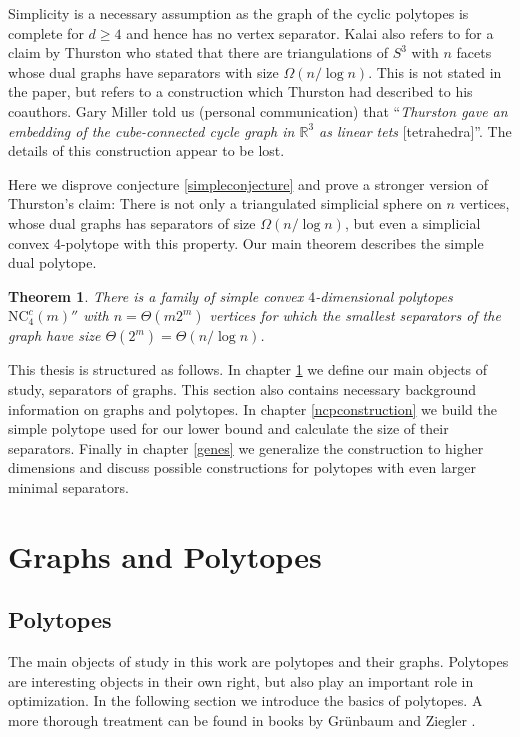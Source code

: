 \documentclass[a4paper,12pt]{book}
\theoremstyle{plain}
\newtheorem{theorem}{Theorem}[section]
\theoremstyle{definition}
\newcommand\NCC{\mathrm{NC}^c}
\begin{document}
Simplicity is a necessary assumption as the graph of the cyclic polytopes is complete for 
$d\geq 4$ and hence has no vertex separator. Kalai also refers to 
\cite{MillerTengThurstonVavasis} for a claim by Thurston who stated that there are triangulations of 
$S^3$ with $n$ facets whose dual graphs have separators with size $\Omega(n/\log n)$. This is not 
stated in the paper, but refers to a construction which Thurston had described to his 
coauthors. Gary Miller told us (personal communication) that 
“\textit{Thurston gave an embedding of the cube-connected cycle graph in $\mathbb{R}^3$
as linear tets} [tetrahedra]”. The details of this construction appear to be lost.

Here we disprove conjecture \ref{simpleconjecture} and prove a stronger version of Thurston's claim: There is not only a triangulated simplicial sphere
on $n$ vertices, whose dual graphs has separators of size $\Omega(n/\log n)$, but even a simplicial convex 4-polytope
with this property. Our main theorem describes the simple dual polytope.

\begin{theorem}
There is a family of simple convex $4$-dimensional polytopes $\NCC_4(m)''$ with $n=\Theta(m 2^m)$ vertices for which
the smallest separators of the graph have size $\Theta(2^m) = \Theta(n/\log n)$.
\label{maintheorem}
\end{theorem}

This thesis is structured as follows. In chapter \ref{mathchapter} we define our main objects of study,
separators of graphs. This section also contains necessary background information on 
graphs and polytopes. In chapter \ref{ncpconstruction} we build the simple polytope used for our 
lower bound and calculate the size of their separators. Finally in chapter \ref{genes} we generalize
the construction to higher dimensions and discuss possible constructions for polytopes with even larger
minimal separators.

\chapter{Graphs and Polytopes}
\label{mathchapter}

\section{Polytopes}

The main objects of study in this work are polytopes and their graphs. Polytopes are 
interesting 
objects in their own right, but also play an important role in
optimization. In the following section we introduce the basics of polytopes. 
A more thorough treatment can be found in books by Gr\"unbaum \cite{Grunbaum69convexpolytopes} and Ziegler \cite{PolyLec} . 
\end{document}
